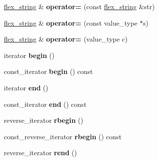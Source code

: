 \begin{DoxyCompactItemize}
\item 
\hypertarget{classflex__string_a747444808628335f796005e33fca486e}{}\hyperlink{classflex__string}{flex\+\_\+string} \& {\bfseries operator=} (const \hyperlink{classflex__string}{flex\+\_\+string} \&str)\label{classflex__string_a747444808628335f796005e33fca486e}

\item 
\hypertarget{classflex__string_ac76611e7ef248c3ab031554e50c3a86f}{}\hyperlink{classflex__string}{flex\+\_\+string} \& {\bfseries operator=} (const value\+\_\+type $\ast$s)\label{classflex__string_ac76611e7ef248c3ab031554e50c3a86f}

\item 
\hypertarget{classflex__string_a817c6c368496152f83da6e661ff64060}{}\hyperlink{classflex__string}{flex\+\_\+string} \& {\bfseries operator=} (value\+\_\+type c)\label{classflex__string_a817c6c368496152f83da6e661ff64060}

\item 
\hypertarget{classflex__string_a06025498b76a2660dfb25b0c4aa63469}{}iterator {\bfseries begin} ()\label{classflex__string_a06025498b76a2660dfb25b0c4aa63469}

\item 
\hypertarget{classflex__string_ab06752c30321809dff9616aef60202dd}{}const\+\_\+iterator {\bfseries begin} () const \label{classflex__string_ab06752c30321809dff9616aef60202dd}

\item 
\hypertarget{classflex__string_a2cd3953a1928e4b3a495277cf6264c47}{}iterator {\bfseries end} ()\label{classflex__string_a2cd3953a1928e4b3a495277cf6264c47}

\item 
\hypertarget{classflex__string_af82226838b1e13a7b196ccebecda6786}{}const\+\_\+iterator {\bfseries end} () const \label{classflex__string_af82226838b1e13a7b196ccebecda6786}

\item 
\hypertarget{classflex__string_a09c0ee34a964d70f79a8b503c8b71008}{}reverse\+\_\+iterator {\bfseries rbegin} ()\label{classflex__string_a09c0ee34a964d70f79a8b503c8b71008}

\item 
\hypertarget{classflex__string_a7f41c942769ce469cb2912c9828bf4bc}{}const\+\_\+reverse\+\_\+iterator {\bfseries rbegin} () const \label{classflex__string_a7f41c942769ce469cb2912c9828bf4bc}

\item 
\hypertarget{classflex__string_ad6c6cb1838871504899ddb007eb4696d}{}reverse\+\_\+iterator {\bfseries rend} ()\label{classflex__string_ad6c6cb1838871504899ddb007eb4696d}


\end{DoxyCompactItemize}
